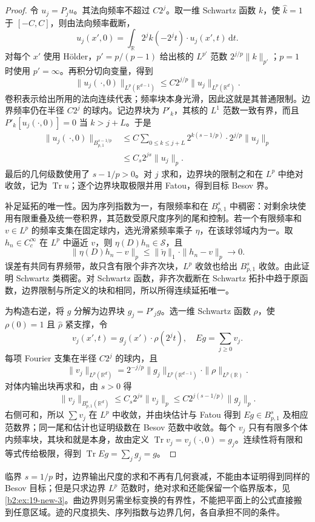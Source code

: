 \begin{proof}
令 \(u_j=P_ju\)。其法向频率不超过 \(C2^j\)。取一维 Schwartz 函数 \(k\)，使 \(\widehat k=1\) 于 \([-C,C]\)，则由法向频率截断，
\[
 u_j(x',0)=\int_{\mathbb R}2^jk(-2^jt)\cdot u_j(x',t)\,\mathrm dt.
\]
对每个 \(x'\) 使用 Hölder，\(p'=p/(p-1)\) 给出核的 \(L^{p'}\) 范数 \(2^{j/p}\|k\|_{p'}\)；\(p=1\) 时使用 \(p'=\infty\)。再积分切向变量，得到
\[
 \|u_j(\,\cdot,0)\|_{L^p(\mathbb R^{d-1})}
 \leq C2^{j/p}\|u_j\|_{L^p(\mathbb R^d)}.
\]
卷积表示给出所用的法向连续代表；频率块本身光滑，因此这就是其普通限制。边界频率仍在半径 \(C2^j\) 的球内。记边界块为 \(P'_k\)，其核的 \(L^1\) 范数一致有界，而且 \(P'_k[u_j(\cdot,0)]=0\) 当 \(k>j+L\)。于是
\[
 \begin{aligned}
 \|u_j(\,\cdot,0)\|_{B^{s-1/p}_{p,1}}
 &\leq C\sum_{0\leq k\leq j+L}2^{k(s-1/p)}
              \cdot2^{j/p}\|u_j\|_p\\
 &\leq C_s2^{js}\|u_j\|_p.
 \end{aligned}
\]
最后的几何级数使用了 \(s-1/p>0\)。对 \(j\) 求和，边界块的限制之和在 \(L^p\) 中绝对收敛，记为 \(\operatorname{Tr}u\)；逐个边界块取极限并用 Fatou，得到目标 Besov 界。

补足延拓的唯一性。因为序列指数为一，有限频率和在 \(B^s_{p,1}\) 中稠密：对剩余块使用有限重叠及统一卷积界，其范数受原尺度序列的尾和控制。若一个有限频率和 \(v\in L^p\) 的频率支集在固定球内，选光滑紧频率乘子 \(\eta\)，在该球邻域内为一。取 \(h_n\in C_c^\infty\) 在 \(L^p\) 中逼近 \(v\)，则 \(\eta(D)h_n\in\mathcal S\)，且
\[
 \|\eta(D)h_n-v\|_p
 \leq\|\check\eta\|_1\cdot\|h_n-v\|_p\longrightarrow0.
\]
误差有共同有界频带，故只含有限个非齐次块，\(L^p\) 收敛也给出 \(B^s_{p,1}\) 收敛。由此证明 Schwartz 类稠密。对 Schwartz 函数，非齐次截断在 Schwartz 拓扑中趋于原函数，边界限制与所定义的块和相同，所以所得连续延拓唯一。

为构造右逆，将 \(g\) 分解为边界块 \(g_j=P'_jg\)。选一维 Schwartz 函数 \(\rho\)，使 \(\rho(0)=1\) 且 \(\widehat\rho\) 紧支撑，令
\[
 v_j(x',t)=g_j(x')\cdot\rho(2^jt),
 \quad Eg=\sum_{j\geq0}v_j.
\]
每项 Fourier 支集在半径 \(C2^j\) 的球内，且
\[
 \|v_j\|_{L^p(\mathbb R^d)}
 =2^{-j/p}\|g_j\|_{L^p(\mathbb R^{d-1})}\cdot\|\rho\|_{L^p(\mathbb R)}.
\]
对体内输出块再求和，由 \(s>0\) 得
\[
 \|v_j\|_{B^s_{p,1}(\mathbb R^d)}
 \leq C_s2^{js}\|v_j\|_p
 \leq C2^{j(s-1/p)}\|g_j\|_p.
\]
右侧可和，所以 \(\sum v_j\) 在 \(L^p\) 中收敛，并由块估计与 Fatou 得到 \(Eg\in B^s_{p,1}\) 及相应范数界；同一尾和估计也证明级数在 Besov 范数中收敛。每个 \(v_j\) 只有有限多个体内频率块，其块和就是本身，故由定义 \(\operatorname{Tr}v_j=v_j(\cdot,0)=g_j\)。连续性将有限和等式传给极限，得到 \(\operatorname{Tr}Eg=\sum_jg_j=g\)。
\end{proof}
临界 \(s=1/p\) 时，边界输出尺度的求和不再有几何衰减，不能由本证明得到同样的 Besov 目标；但是只求边界 \(L^p\) 范数时，绝对求和还能保留一个临界版本，见\cref{b2:ex:19-new-3}。曲边界则另需坐标变换的有界性，不能把平面上的公式直接搬到任意区域。迹的尺度损失、序列指数与边界几何，各自承担不同的条件。

